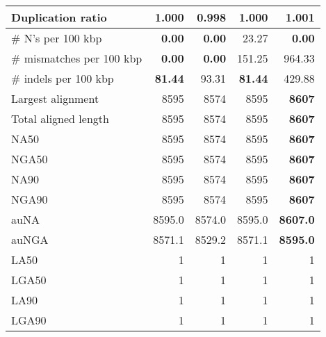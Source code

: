 \documentclass[12pt,a4paper]{article}
\begin{document}
\begin{table}[ht]
\begin{center}
\begin{tabular}{|l*{4}{|r}|}
Duplication ratio & 1.000 & {\bf 0.998} & 1.000 & 1.001 \\ \hline
\# N's per 100 kbp & {\bf 0.00} & {\bf 0.00} & 23.27 & {\bf 0.00} \\ \hline
\# mismatches per 100 kbp & {\bf 0.00} & {\bf 0.00} & 151.25 & 964.33 \\ \hline
\# indels per 100 kbp & {\bf 81.44} & 93.31 & {\bf 81.44} & 429.88 \\ \hline
Largest alignment & 8595 & 8574 & 8595 & {\bf 8607} \\ \hline
Total aligned length & 8595 & 8574 & 8595 & {\bf 8607} \\ \hline
NA50 & 8595 & 8574 & 8595 & {\bf 8607} \\ \hline
NGA50 & 8595 & 8574 & 8595 & {\bf 8607} \\ \hline
NA90 & 8595 & 8574 & 8595 & {\bf 8607} \\ \hline
NGA90 & 8595 & 8574 & 8595 & {\bf 8607} \\ \hline
auNA & 8595.0 & 8574.0 & 8595.0 & {\bf 8607.0} \\ \hline
auNGA & 8571.1 & 8529.2 & 8571.1 & {\bf 8595.0} \\ \hline
LA50 & 1 & 1 & 1 & 1 \\ \hline
LGA50 & 1 & 1 & 1 & 1 \\ \hline
LA90 & 1 & 1 & 1 & 1 \\ \hline
LGA90 & 1 & 1 & 1 & 1 \\ \hline
\end{tabular}
\end{center}
\end{table}
\end{document}

